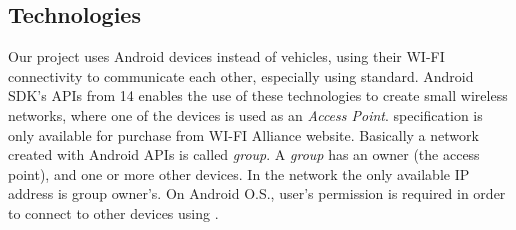 \subsection{Technologies}

Our project uses Android devices instead of vehicles, using their WI-FI connectivity to communicate each other, especially using \direct standard. Android SDK's APIs from 14 enables the use of these technologies to create small wireless networks, where one of the devices is used as an \emph{Access Point}. \direct specification is only available for purchase from WI-FI Alliance\textsuperscript{\texttrademark} website\cite{wifi_direct}.
Basically a network created with Android \direct APIs is called \emph{group}. A \emph{group} has an owner (the access point), and one or more other devices. In the network the only available IP address is group owner's. 
On Android O.S., user's permission is required in order to connect to other devices using \direct.
